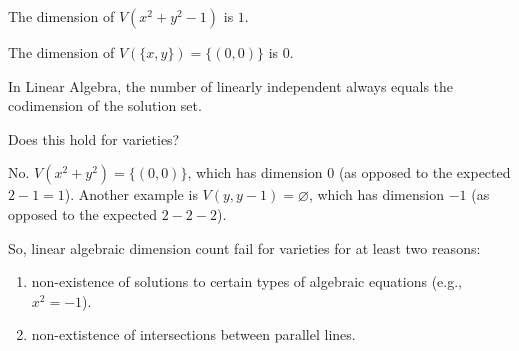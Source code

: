\begin{exmp}
	The dimension of $V(x^2 + y^2 - 1)$ is $1$.
\end{exmp}

\begin{exmp}
	The dimension of $V(\{x, y\}) = \{(0, 0)\}$ is $0$.
\end{exmp}

In Linear Algebra, the number of linearly independent always equals the codimension of the solution set.

\begin{ques}
	Does this hold for varieties?
\end{ques}
\begin{ans}
	No. $V(x^2 + y^2) = \{(0, 0)\}$, which has dimension $0$ (as opposed to the expected $2 - 1 = 1$). Another example is $V(y, y - 1) = \varnothing$, which has dimension $-1$ (as opposed to the expected $2 - 2 - 2$).
\end{ans}

So, linear algebraic dimension count fail for varieties for at least two reasons:
\begin{enumerate}[label = \textbullet]
	\item non-existence of solutions to certain types of algebraic equations (e.g., $x^2 = - 1$).
	\item non-extistence of intersections between parallel lines.
\end{enumerate}
